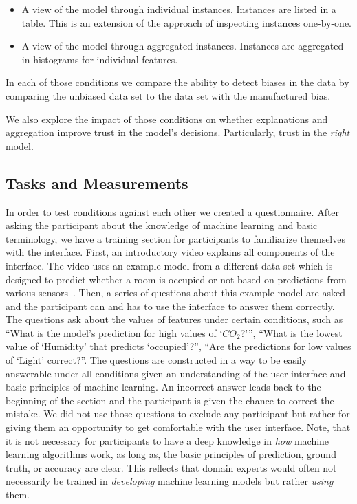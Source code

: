 \begin{itemize}
	\item
    A view of the model through individual instances.
    Instances are listed in a table.
    This is an extension of the approach of inspecting instances one-by-one.
    \item
    A view of the model through aggregated instances.
    Instances are aggregated in histograms for individual features.
\end{itemize}

In each of those conditions we compare the ability to detect biases in the data by comparing the unbiased data set to the data set with the manufactured bias.

We also explore the impact of those conditions on whether explanations and aggregation improve trust in the model's decisions.
Particularly, trust in the \emph{right} model.

\subsection{Tasks and Measurements}
In order to test conditions against each other we created a questionnaire.
After asking the participant about the knowledge of machine learning and basic terminology, we have a training section for participants to familiarize themselves with the interface.
First, an introductory video explains all components of the interface.
The video uses an example model from a different data set which is designed to predict whether a room is occupied or not based on predictions from various sensors~\cite{occupancy}.
Then, a series of questions about this example model are asked and the participant can and has to use the interface to answer them correctly.
The questions ask about the values of features under certain conditions, such as ``What is the model's prediction for high values of `$CO_2$?''', ``What is the lowest value of `Humidity' that predicts `occupied'?'', ``Are the predictions for low values of `Light' correct?''.
The questions are constructed in a way to be easily answerable under all conditions given an understanding of the user interface and basic principles of machine learning.
An incorrect answer leads back to the beginning of the section and the participant is given the chance to correct the mistake.
We did not use those questions to exclude any participant but rather for giving them an opportunity to get comfortable with the user interface.
Note, that it is not necessary for participants to have a deep knowledge in \emph{how} machine learning algorithms work, as long as, the basic principles of prediction, ground truth, or accuracy are clear.  This reflects that domain experts would often not necessarily be trained in \emph{developing} machine learning models but rather \emph{using} them.

